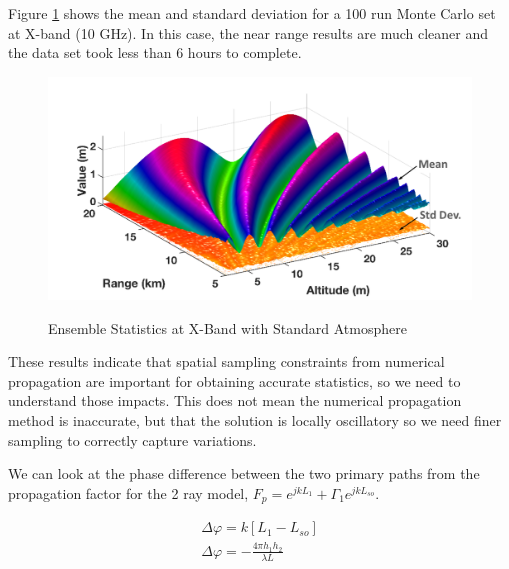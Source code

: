 Figure \ref{stat_fig:2} shows the mean and standard deviation for a 100 run Monte Carlo set at X-band (10 GHz). In this case, the near range results are much cleaner and the data set took less than 6 hours to complete.
\begin{figure}[H]
  \begin{center}
\includegraphics[width=5in]{../media/statistics/x_band_stats.png}
  \end{center}
  \renewcommand{\baselinestretch}{1} \small\normalsize
  \begin{quote}
    \caption[Ensemble Statistics at X-Band with Standard Atmosphere]{Ensemble Statistics at X-Band with Standard Atmosphere\label{stat_fig:2}}
  \end{quote}
\end{figure}
\renewcommand{\baselinestretch}{2} \small\normalsize

These results indicate that spatial sampling constraints from numerical propagation are important for obtaining accurate statistics, so we need to understand those impacts. This does not mean the numerical propagation method is inaccurate, but that the solution is locally oscillatory so we need finer sampling to correctly capture variations.

We can look at the phase difference between the two primary paths from the propagation factor for the 2 ray model, $F_p = e^{jkL_1} + \Gamma_1e^{jkL_{so}}$. 

\begin{equation}
\begin{gathered}
\Delta\varphi = k\left[ L_1 - L_{so}\right] \\
\Delta\varphi = -\frac{4\pi h_1h_2}{\lambda L}
\label{stat_eq:1}
\end{gathered}
\end{equation}
\renewcommand{\baselinestretch}{2} \small\normalsize


